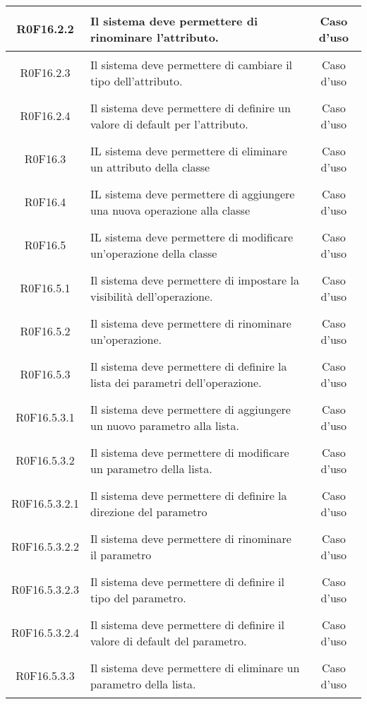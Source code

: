 \documentclass[../AnalisiDeiRequisiti.tex]{subfiles}
\begin{document}
\begin{longtable}{|c|>{\centering}p{7cm}|c|}
	\hypertarget{R0F16.2.2}{R0F16.2.2} & Il sistema deve permettere di rinominare l'attributo. & Caso d'uso \\ \hline
	\hypertarget{R0F16.2.3}{R0F16.2.3} & Il sistema deve permettere di cambiare il tipo dell'attributo. & Caso d'uso \\ \hline
	\hypertarget{R0F16.2.4}{R0F16.2.4} & Il sistema deve permettere di definire un valore di default per l'attributo. & Caso d'uso \\ \hline
	\hypertarget{R0F16.3}{R0F16.3} & IL sistema deve permettere di eliminare un attributo della classe & Caso d'uso \\ \hline
	\hypertarget{R0F16.4}{R0F16.4} & IL sistema deve permettere di aggiungere una nuova operazione alla classe & Caso d'uso \\ \hline
	\hypertarget{R0F16.5}{R0F16.5} & IL sistema deve permettere di modificare un'operazione della classe & Caso d'uso \\ \hline
	\hypertarget{R0F16.5.1}{R0F16.5.1} & Il sistema deve permettere di impostare la visibilità dell'operazione. & Caso d'uso \\ \hline
	\hypertarget{R0F16.5.2}{R0F16.5.2} & Il sistema deve permettere di rinominare un'operazione.  & Caso d'uso \\ \hline
	\hypertarget{R0F16.5.3}{R0F16.5.3} & Il sistema deve permettere di definire la lista dei parametri dell'operazione. & Caso d'uso \\ \hline
	\hypertarget{R0F16.5.3.1}{R0F16.5.3.1} & Il sistema deve permettere di aggiungere un nuovo parametro alla lista. & Caso d'uso \\ \hline
	\hypertarget{R0F16.5.3.2}{R0F16.5.3.2} & Il sistema deve permettere di modificare un parametro della lista. & Caso d'uso \\ \hline
	\hypertarget{R0F16.5.3.2.1}{R0F16.5.3.2.1} & Il sistema deve permettere di definire la direzione del parametro & Caso d'uso \\ \hline
	\hypertarget{R0F16.5.3.2.2}{R0F16.5.3.2.2} & Il sistema deve permettere di rinominare il parametro & Caso d'uso \\ \hline
	\hypertarget{R0F16.5.3.2.3}{R0F16.5.3.2.3} & Il sistema deve permettere di definire il tipo del parametro. & Caso d'uso \\ \hline
	\hypertarget{R0F16.5.3.2.4}{R0F16.5.3.2.4} & Il sistema deve permettere di definire il valore di default del parametro.  & Caso d'uso \\ \hline
	\hypertarget{R0F16.5.3.3}{R0F16.5.3.3} & Il sistema deve permettere di eliminare un parametro della lista. & Caso d'uso \\ \hline

\end{longtable}
\end{document}
